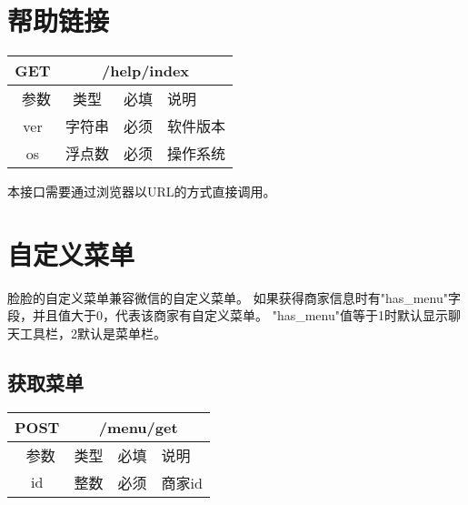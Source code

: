 \documentclass[cs4size]{ctexartutf8}
\begin{document}
\section{帮助链接}

\begin{table}[H]
   \begin{center}
\begin{tabular}{|c|c|c|p{12cm}|}
\hline
GET & \multicolumn{3}{|c|}{/help/index} \\
\hline\hline
 \  参数  & 类型 & 必填 &  说明  \\
 \hline
 ver  & 字符串 & 必须 & 软件版本\\
\hline
 os  & 浮点数 & 必须 & 操作系统\\
\hline
\end{tabular}
   \end{center}
\end{table}

本接口需要通过浏览器以URL的方式直接调用。


\section{自定义菜单}
脸脸的自定义菜单兼容微信的自定义菜单。
如果获得商家信息时有"has\_menu"字段，并且值大于0，代表该商家有自定义菜单。 "has\_menu"值等于1时默认显示聊天工具栏，2默认是菜单栏。

\subsection{获取菜单}

\begin{table}[H]
   \begin{center}
\begin{tabular}{|c|c|c|p{12cm}|}
\hline
POST & \multicolumn{3}{|c|}{/menu/get} \\
\hline\hline
 \  参数  & 类型 & 必填 &  说明  \\
   \hline
 id  & 整数 & 必须 & 商家id\\ 
  \hline
\end{tabular}
   \end{center}
\end{table}
\end{document}
